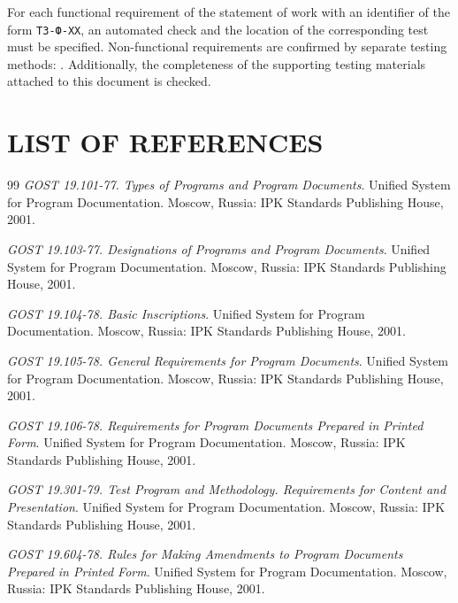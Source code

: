 \documentclass[12pt,a4paper]{extarticle}
\begin{document}
\begin{hseExample}
For each functional requirement of the statement of work with an identifier of the form \texttt{ТЗ-Ф-XX}, an automated check and the location of the corresponding test must be specified. Non-functional requirements are confirmed by separate testing methods: . Additionally, the completeness of the supporting testing materials attached to this document is checked.
\end{hseExample}

\clearpage
\pagestyle{appendix}

\section*{LIST OF REFERENCES}

\renewcommand{\refname}{}
\begin{thebibliography}{99}
\emph{GOST 19.101-77. Types of Programs and Program Documents}. Unified System for Program Documentation. Moscow, Russia: IPK Standards Publishing House, 2001.

\emph{GOST 19.103-77. Designations of Programs and Program Documents}. Unified System for Program Documentation. Moscow, Russia: IPK Standards Publishing House, 2001.

\emph{GOST 19.104-78. Basic Inscriptions}. Unified System for Program Documentation. Moscow, Russia: IPK Standards Publishing House, 2001.

\emph{GOST 19.105-78. General Requirements for Program Documents}. Unified System for Program Documentation. Moscow, Russia: IPK Standards Publishing House, 2001.

\emph{GOST 19.106-78. Requirements for Program Documents Prepared in Printed Form}. Unified System for Program Documentation. Moscow, Russia: IPK Standards Publishing House, 2001.

\emph{GOST 19.301-79. Test Program and Methodology. Requirements for Content and Presentation}. Unified System for Program Documentation. Moscow, Russia: IPK Standards Publishing House, 2001.

\emph{GOST 19.604-78. Rules for Making Amendments to Program Documents Prepared in Printed Form}. Unified System for Program Documentation. Moscow, Russia: IPK Standards Publishing House, 2001.
\end{thebibliography}



\clearpage


\end{document}
